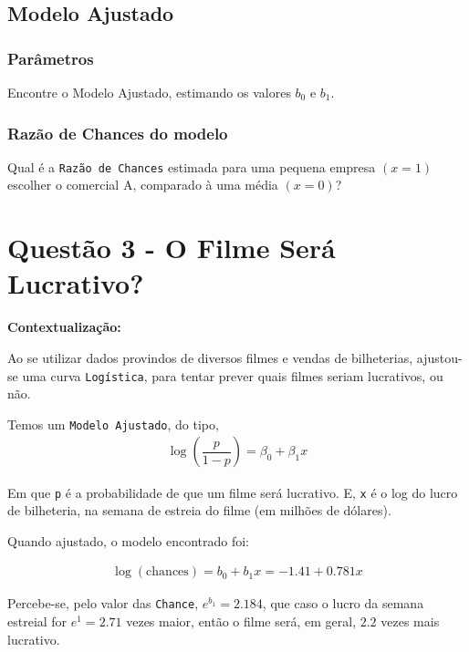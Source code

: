 \documentclass[11pt]{article}
\begin{document}
\subsection{Modelo Ajustado}
\label{sec:org99ce477}
\subsubsection{Parâmetros}
\label{sec:orgd5d1426}
Encontre o Modelo Ajustado, estimando os valores \(b_0\) e \(b_1\).
\subsubsection{Razão de Chances do modelo}
\label{sec:org9cec49a}
Qual é a \texttt{Razão de Chances} estimada para uma pequena empresa \((x=1)\) escolher o
comercial A, comparado à uma média \((x=0)\)?


\section{Questão 3 - O Filme Será Lucrativo?}
\label{sec:org1dd0782}
\textbf{Contextualização:}

Ao se utilizar dados provindos de diversos filmes e vendas de
bilheterias, ajustou-se uma curva \texttt{Logística}, para tentar prever
quais filmes seriam lucrativos, ou não.

Temos um \texttt{Modelo Ajustado}, do tipo,
  \begin{equation}
\begin{aligned}
    \log\left(\dfrac{p}{1-p}\right) = \beta_0 + \beta_1{}x
\end{aligned}
\end{equation}

Em que \texttt{p} é a probabilidade de que um filme será lucrativo. E, \texttt{x}
é o log do lucro de bilheteria, na semana de estreia do filme (em
milhões de dólares).

Quando ajustado, o modelo encontrado foi:

\begin{equation}
  \begin{aligned}
    \log(\textrm{chances}) = b_0 + b_1 x = -1.41+0.781x
  \end{aligned}
\end{equation}

Percebe-se, pelo valor das \texttt{Chance}, \(e^{b_1}=2.184\), que caso o
lucro da semana estreial for \(e^1=2.71\) vezes maior, então o filme
será, em geral, \(2.2\) vezes mais lucrativo.
\end{document}
